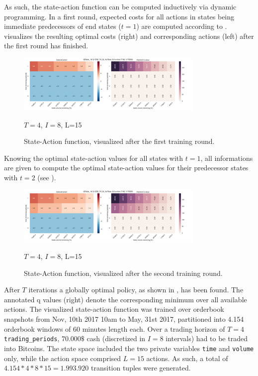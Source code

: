 As such, the state-action function can be computed inductively via dynamic programming. In a first round, expected costs for all actions in states being immediate predecessors of end states (\ie $t=1$) are computed according to .  visualizes the resulting optimal costs (right) and corresponding actions (left) after the first round has finished.

\begin{figure}[ht]
	\centering
   \includegraphics[width=0.8\textwidth]{content/drawings/heatmap_3months_t1}
	\caption{State-Action function, visualized after the first training round.}
	$T=4$, $I=8$, L=15
	\label{fig:heatmap:t1}
\end{figure}

Knowing the optimal state-action values for all states with $t=1$, all informations are given to compute the optimal state-action values for their predecessor states with $t=2$ (see ).

\begin{figure}[ht]
	\centering
   \includegraphics[width=0.8\textwidth]{content/drawings/heatmap_3months_t2}
	\caption{State-Action function, visualized after the second training round.}
	$T=4$, $I=8$, L=15
	\label{fig:heatmap:t2}
\end{figure}

After $T$ iterations a globally optimal policy, as shown in , has been found. The annotated q values (right) denote the corresponding minimum over all available actions. The visualized state-action function was trained over orderbook snapshots from Nov, 10th 2017 10am to May, 31st 2017, partitioned into 4.154 orderbook windows of 60 minutes length each. Over a trading horizon of $T=4$ \lstinline!trading_periods!, $70.000\$$ cash (discretized in $I=8$ intervals) had to be traded into Bitcoins. The state space included the two private variables \lstinline!time! and \lstinline!volume! only, while the action space comprised $L=15$ actions. As such, a total of $4.154 * 4 * 8 * 15 = 1.993.920$ transition tuples were generated.\\

